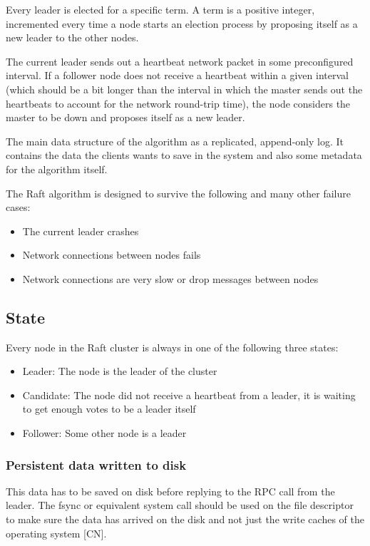 Every leader is elected for a specific term. A term is a positive integer, incremented every time a node starts an election process by proposing itself as a new leader to the other nodes.

The current leader sends out a heartbeat network packet in some preconfigured interval. If a follower node does not receive a heartbeat within a given interval (which should be a bit longer than the interval in which the master sends out the heartbeats to account for the network round-trip time), the node considers the master to be down and proposes itself as a new leader.

The main data structure of the algorithm as a replicated, append-only log. It contains the data the clients wants to save in the system and also some metadata
for the algorithm itself.

The Raft algorithm is designed to survive the following and many other failure cases:
\begin{itemize}
    \item The current leader crashes
    \item Network connections between nodes fails
    \item Network connections are very slow or drop messages between nodes
\end{itemize}

\subsection{State}
Every node in the Raft cluster is always in one of the following three states:
\begin{itemize}
    \item Leader: The node is the leader of the cluster
    \item Candidate: The node did not receive a heartbeat from a leader, it is waiting to get enough votes to be a leader itself
    \item Follower: Some other node is a leader
\end{itemize}

\subsubsection*{Persistent data written to disk}

This data has to be saved on disk before replying to the RPC call from the leader. The fsync or equivalent system call should be used on the file descriptor to make sure the data has arrived on the disk and not just the write caches of the operating system [CN].

